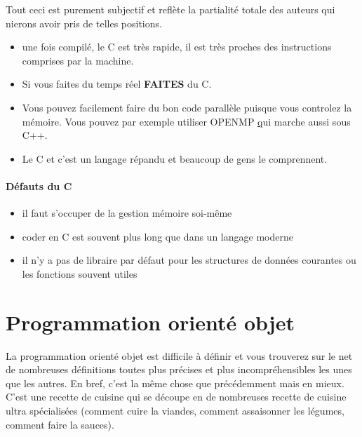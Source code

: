 Tout ceci est purement subjectif et reflète la partialité totale des auteurs qui nierons
 avoir pris de telles positions.
\begin{itemize}
\item une fois compilé, le C est très rapide, il est très proches des instructions comprises par la machine. 
\item Si vous faites du temps réel \textbf{FAITES} du C.
\item Vous pouvez facilement faire du bon code parallèle puisque vous controlez la mémoire.
Vous pouvez par exemple utiliser OPENMP \href{http://openmp.org/} qui marche aussi sous C++.
\item Le C et c'est un langage répandu et beaucoup de gens le comprennent.
\end{itemize}

\paragraph{Défauts du C}

\begin{itemize}
\item il faut s'occuper de la gestion mémoire soi-même
\item coder en C est souvent plus long que dans un langage moderne
\item il n'y a pas de libraire par défaut pour les structures de données courantes ou les fonctions souvent utiles
\end{itemize}

\section{Programmation orienté objet}

La programmation orienté objet est difficile à définir et vous trouverez sur le net de nombreuses 
définitions toutes plus précises et plus incompréhensibles les unes que les autres.
 En bref, c'est la même chose que précédemment mais en mieux. C'est une recette de cuisine qui se 
découpe en de nombreuses recette de cuisine ultra spécialisées (comment cuire la viandes,
 comment assaisonner les légumes, comment faire la sauces).\\

